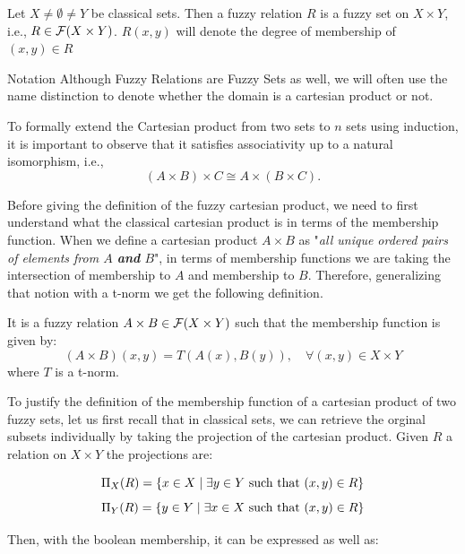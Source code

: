 \begin{definition}
  Let $X\neq \emptyset \neq Y$ be classical sets. Then a fuzzy relation $R$ is a fuzzy set on $X\times Y$, i.e., $R\in \mathcal{F}(X\times Y)$. $R(x,y)$ will denote the degree of membership of $(x,y) \in R$
\end{definition}

\begin{notation}[label={not:compositionFS}]{Notation}
  Although Fuzzy Relations are Fuzzy Sets as well, we will often use the name distinction to denote whether the domain is a cartesian product or not.
\end{notation}

\begin{remark}
  To formally extend the Cartesian product from two sets to \( n \) sets using induction, it is important to observe that it satisfies associativity up to a natural isomorphism, i.e., 
  \[
  (A\times B)\times C \cong A\times (B\times C).
  \]
\end{remark}

Before giving the definition of the fuzzy cartesian product, we need to first understand what the classical cartesian product is in terms of the membership function. When we define a cartesian product $A\times B$ as "\textit{all unique ordered pairs of elements from $A$ \textbf{and} $B$}", in terms of membership functions we are taking the intersection of membership to $A$ and membership to $B$. Therefore, generalizing that notion with a t-norm we get the following definition.

\begin{definition}
  It is a fuzzy relation $A\times B \in \mathcal{F}(X\times Y)$ such that the membership function is given by:
  \[ 
  (A\times B)(x,y) = T(A(x), B(y)), \quad \forall (x,y) \in X\times Y
  \]
  where $T$ is a t-norm.
\end{definition}

To justify the definition of the membership function of a cartesian product of two fuzzy sets, let us first recall that in classical sets, we can retrieve the orginal subsets individually by taking the projection of the cartesian product. Given $R$ a relation on $X\times Y$ the projections are:

\[\Pi_X(R)=\{x \in X \mid \exists y \in Y \textnormal{ such that } (x,y) \in R\}\]
\[\Pi_Y(R)=\{y \in Y \mid \exists x \in X \textnormal{ such that } (x,y) \in R\}\]

Then, with the boolean membership, it can be expressed as well as:

